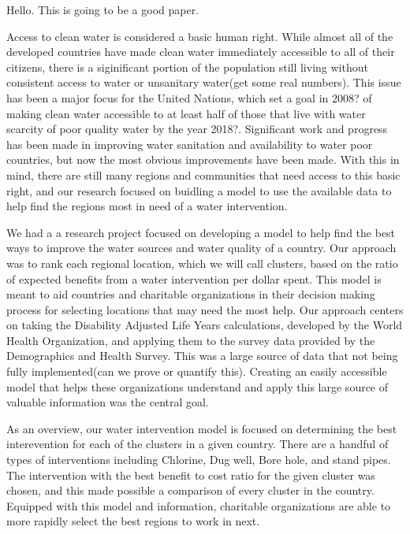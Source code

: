 Hello. This is going to be a good paper.

Access to clean water is considered a basic human right. While almost all of the developed countries have made clean water immediately accessible to all of their citizens, there is a siginificant portion of the population still living without consistent access to water or unsanitary water(get some real numbers). This issue has been a major focus for the United Nations, which set a goal in 2008? of making clean water accessible to at least half of those that live with water scarcity of poor quality water by the year 2018?. Significant work and progress has been made in improving water sanitation and availability to water poor countries, but now the most obvious improvements have been made. With this in mind, there are still many regions and communities that need access to this basic right, and our research focused on buidling a model to use the available data to help find the regions most in need of a water intervention.

We had a a research project focused on developing a model to help find the best ways to improve the water sources and water quality of a country. Our approach was to rank each regional location, which we will call clusters, based on the ratio of expected benefits from a water intervention per dollar spent. This model is meant to aid countries and charitable organizations in their decision making process for selecting locations that may need the most help. Our approach centers on taking the Disability Adjusted Life Years calculations, developed by the World Health Organization, and applying them to the survey data provided by the Demographics and Health Survey. This was a large source of data that not being fully implemented(can we prove or quantify this). Creating an easily accessible model that helps these organizations understand and apply this large source of valuable information was the central goal.
	
As an overview, our water intervention model is focused on determining the best interevention for each of the clusters in a given country. There are a handful of types of interventions including Chlorine, Dug well, Bore hole, and stand pipes. The intervention with the best benefit to cost ratio for the given cluster was chosen, and this made possible a comparison of every cluster in the country. Equipped with this model and information, charitable organizations are able to more rapidly select the best regions to work in next.